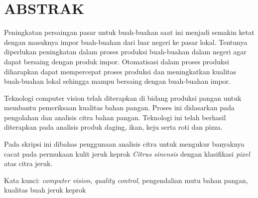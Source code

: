 \documentclass[laporan.tex]{subfiles}
\begin{document}
\chapter*{ABSTRAK}

Peningkatan persaingan pasar untuk buah-buahan saat ini menjadi semakin ketat dengan masuknya impor buah-buahan dari luar negeri ke pasar lokal. Tentunya diperlukan peningkatan dalam proses produksi buah-buahan dalam negeri agar dapat bersaing dengan produk impor. Otomatisasi dalam proses produksi diharapkan dapat mempercepat proses produksi dan meningkatkan kualitas buah-buahan lokal sehingga mampu bersaing dengan buah-buahan impor.

Teknologi computer vision telah diterapkan di bidang produksi pangan untuk membantu pemeriksaan kualitas bahan pangan. Proses ini didasarkan pada pengolahan dan analisis citra bahan pangan. Teknologi ini telah berhasil diterapkan pada analisis produk daging, ikan, keju serta roti dan pizza.

Pada skripsi ini dibahas penggunaan analisis citra untuk mengukur banyaknya cacat pada permukaan kulit jeruk keprok \emph{Citrus sinensis} dengan klasifikasi \emph{pixel} atas citra jeruk.

Kata kunci: \emph{computer vision}, \emph{quality control}, pengendalian mutu bahan pangan, kualitas buah jeruk keprok
\end{document}
